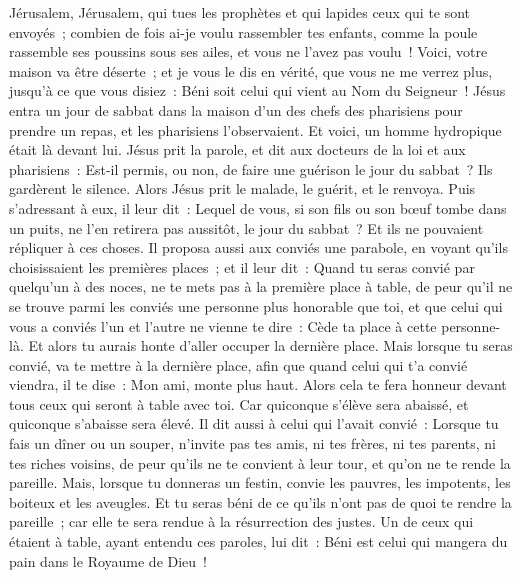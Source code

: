 \begin{multicols}{2}
Jérusalem, Jérusalem, qui tues les prophètes et qui lapides ceux qui te sont envoyés~; combien de fois ai-je voulu rassembler tes enfants, comme la poule rassemble ses poussins sous ses ailes, et vous ne l'avez pas voulu~!
Voici, votre maison va être déserte~; et je vous le dis en vérité, que vous ne me verrez plus, jusqu'à ce que vous disiez~: Béni soit celui qui vient au Nom du Seigneur~!
\VerseOne{}Jésus entra un jour de sabbat dans la maison d'un des chefs des pharisiens pour prendre un repas, et les pharisiens l'observaient.
Et voici, un homme hydropique était là devant lui.
Jésus prit la parole, et dit aux docteurs de la loi et aux pharisiens~: Est-il permis, ou non, de faire une guérison le jour du sabbat~?
Ils gardèrent le silence. Alors Jésus prit le malade, le guérit, et le renvoya.
Puis s'adressant à eux, il leur dit~: Lequel de vous, si son fils ou son bœuf tombe dans un puits, ne l'en retirera pas aussitôt, le jour du sabbat~?
Et ils ne pouvaient répliquer à ces choses.
Il proposa aussi aux conviés une parabole, en voyant qu'ils choisissaient les premières places~; et il leur dit~:
Quand tu seras convié par quelqu'un à des noces, ne te mets pas à la première place à table, de peur qu'il ne se trouve parmi les conviés une personne plus honorable que toi,
et que celui qui vous a conviés l'un et l'autre ne vienne te dire~: Cède ta place à cette personne-là. Et alors tu aurais honte d'aller occuper la dernière place.
Mais lorsque tu seras convié, va te mettre à la dernière place, afin que quand celui qui t'a convié viendra, il te dise~: Mon ami, monte plus haut. Alors cela te fera honneur devant tous ceux qui seront à table avec toi.
Car quiconque s'élève sera abaissé, et quiconque s'abaisse sera élevé.
Il dit aussi à celui qui l'avait convié~: Lorsque tu fais un dîner ou un souper, n'invite pas tes amis, ni tes frères, ni tes parents, ni tes riches voisins, de peur qu'ils ne te convient à leur tour, et qu'on ne te rende la pareille.
Mais, lorsque tu donneras un festin, convie les pauvres, les impotents, les boiteux et les aveugles.
Et tu seras béni de ce qu'ils n'ont pas de quoi te rendre la pareille~; car elle te sera rendue à la résurrection des justes.
Un de ceux qui étaient à table, ayant entendu ces paroles, lui dit~: Béni est celui qui mangera du pain dans le Royaume de Dieu~!

\end{multicols}
